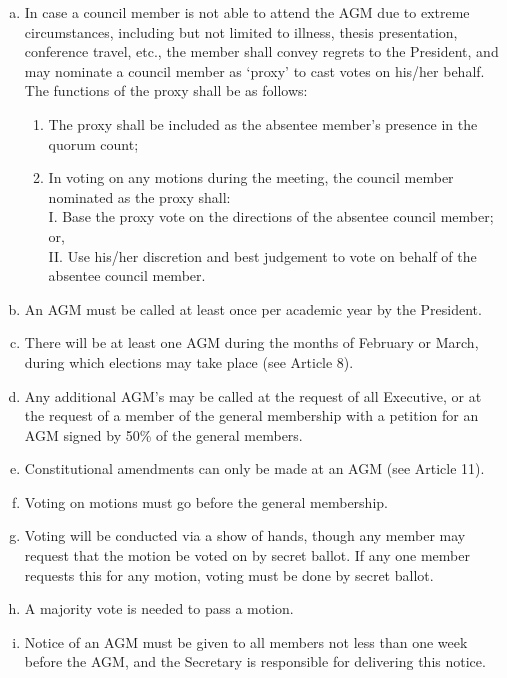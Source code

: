 \documentclass[]{report}
\begin{document}
\begin{enumerate}
\begin{enumerate}[i.]
\begin{enumerate}[(a)]
							\color{red}
						\item In case a council member is not able to attend the AGM due to extreme circumstances, including but not limited to illness, thesis presentation, conference travel, etc., the member shall convey regrets to the President, and may nominate a council member as `proxy' to cast votes on his/her behalf. The functions of the proxy shall be as follows:
							\begin{enumerate}[(1)]
								\item The proxy shall be included as the absentee member's presence in the quorum count; 
								\item In voting on any motions during the meeting, the council member nominated as the proxy shall:\\
									  I. \space Base the proxy vote on the directions of the absentee council member; or,\\
									  II. Use his/her discretion and best judgement to vote on behalf of the absentee council member.
							\end{enumerate}
							 \color{black}
						\item An AGM must be called at least once per academic year by the President.
						\item There will be at least one AGM during the months of February or March, during which elections may take place (see Article 8). 
						\item Any additional AGM's may be called at the request of all Executive, or at the request of a member of the general membership with a petition for an AGM signed by 50\% of the general members.
						\item Constitutional amendments can only be made at an AGM (see Article 11).
						\item Voting on motions must go before the general membership.
						\item Voting will be conducted via a show of hands, though any member may request that the motion be voted on by secret ballot. If any one member requests this for any motion, voting must be done by secret ballot.
						\item A majority vote \color{red}{of those present and voting (including proxies)} \color{black} is needed to pass a motion.
						\item Notice of an AGM must be given to all members not less than one week before the AGM, and the Secretary is responsible for delivering this notice.
					\end{enumerate}
			\end{enumerate}
			
	\end{enumerate}
\end{document}
